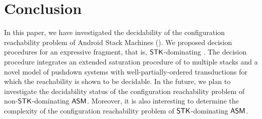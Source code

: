 \documentclass[preprint,12pt]{elsarticle}
\begin{document}
\section{Conclusion}
% 
In this paper, we have investigated the decidability of the configuration reachability problem of Android Stack Machines (\AMASS). We proposed decision procedures for an expressive fragment, that is, $\mathsf{STK}$-dominating {\AMASS}. The decision procedure integrates 
an extended saturation procedure of {\PDS} to multiple stacks and a novel model of pushdown systems with well-partially-ordered transductions for which the reachability is shown to be decidable. In the future, we plan to investigate the decidability status of the configuration reachability problem of non-$\mathsf{STK}$-dominating $\textsf{ASM}$. Moreover, it is also interesting to determine the complexity of the configuration reachability problem of $\mathsf{STK}$-dominating $\textsf{ASM}$. 

%
 


 
\end{document}
